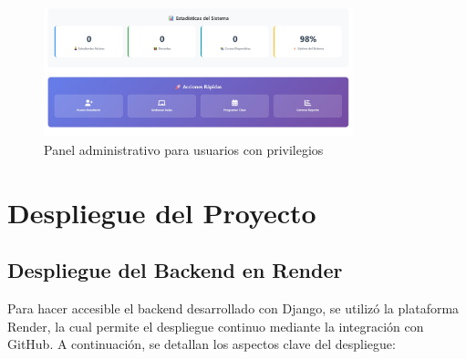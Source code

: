 \documentclass{article}
\begin{document}
\begin{figure}[H]
    \centering
    \includegraphics[width=0.8\textwidth]{images/admin.jpeg}
    \caption{Panel administrativo para usuarios con privilegios}
\end{figure}


    
\section{Despliegue del Proyecto}
    \subsection{Despliegue del Backend en Render}
        Para hacer accesible el backend desarrollado con Django, se utilizó la plataforma Render, la cual permite el despliegue continuo mediante la integración con GitHub. A continuación, se detallan los aspectos clave del despliegue:
\end{document}
